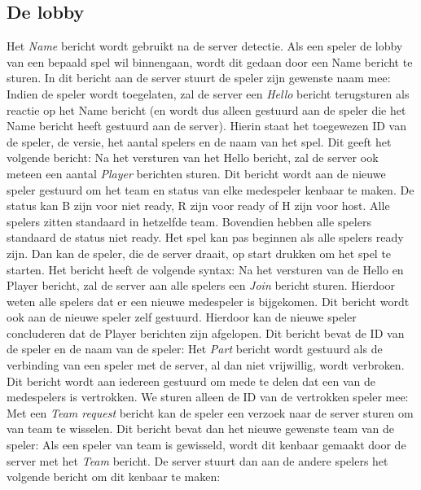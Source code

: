     \subsection{De lobby}
    Het \emph{Name} bericht wordt gebruikt na de server detectie. Als een speler de lobby van een bepaald spel wil binnengaan, wordt dit gedaan door een Name bericht te sturen. In dit bericht aan de server stuurt de speler zijn gewenste naam mee:
    Indien de speler wordt toegelaten, zal de server een \emph{Hello} bericht terugsturen als reactie op het Name bericht (en wordt dus alleen gestuurd aan de speler die het Name bericht heeft gestuurd aan de server). Hierin staat het toegewezen ID van de speler, de versie, het aantal spelers en de naam van het spel. Dit geeft het volgende bericht:
    Na het versturen van het Hello bericht, zal de server ook meteen een aantal \emph{Player} berichten sturen. Dit bericht wordt aan de nieuwe speler gestuurd om het team en status van elke medespeler kenbaar te maken. De status kan B zijn voor niet ready, R zijn voor ready of H zijn voor host. Alle spelers zitten standaard in hetzelfde team. Bovendien hebben alle spelers standaard de status niet ready. Het spel kan pas beginnen als alle spelers ready zijn. Dan kan de speler, die de server draait, op start drukken om het spel te starten. Het bericht heeft de volgende syntax:
    Na het versturen van de Hello en Player bericht, zal de server aan alle spelers een \emph{Join} bericht sturen. Hierdoor weten alle spelers dat er een nieuwe medespeler is bijgekomen. Dit bericht wordt ook aan de nieuwe speler zelf gestuurd. Hierdoor kan de nieuwe speler concluderen dat de Player berichten zijn afgelopen. Dit bericht bevat de ID van de speler en de naam van de speler:
    Het \emph{Part} bericht wordt gestuurd als de verbinding van een speler met de server, al dan niet vrijwillig, wordt verbroken. Dit bericht wordt aan iedereen gestuurd om mede te delen dat een van de medespelers is vertrokken. We sturen alleen de ID van de vertrokken speler mee:
    Met een \emph{Team request} bericht kan de speler een verzoek naar de server sturen om van team te wisselen. Dit bericht bevat dan het nieuwe gewenste team van de speler:
    Als een speler van team is gewisseld, wordt dit kenbaar gemaakt door de server met het \emph{Team} bericht. De server stuurt dan aan de andere spelers het volgende bericht om dit kenbaar te maken:
